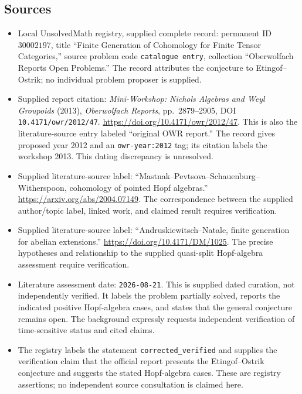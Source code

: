 \documentclass[11pt]{article}
\begin{document}
\subsection{Sources}
\begin{itemize}
\item Local UnsolvedMath registry, supplied complete record: permanent ID \(30002197\), title ``Finite Generation of Cohomology for Finite Tensor Categories,'' source problem code \texttt{catalogue entry}, collection ``Oberwolfach Reports Open Problems.'' The record attributes the conjecture to Etingof--Ostrik; no individual problem proposer is supplied.
\item Supplied report citation: \emph{Mini-Workshop: Nichols Algebras and Weyl Groupoids} (2013), \emph{Oberwolfach Reports}, pp.~2879--2905, DOI \texttt{10.4171/owr/2012/47}. \url{https://doi.org/10.4171/owr/2012/47}. This is also the literature-source entry labeled ``original OWR report.'' The record gives proposed year 2012 and an \texttt{owr-year:2012} tag; its citation labels the workshop 2013. This dating discrepancy is unresolved.
\item Supplied literature-source label: ``Mastnak--Pevtsova--Schauenburg--Witherspoon, cohomology of pointed Hopf algebras.'' \url{https://arxiv.org/abs/2004.07149}. The correspondence between the supplied author/topic label, linked work, and claimed result requires verification.
\item Supplied literature-source label: ``Andruskiewitsch--Natale, finite generation for abelian extensions.'' \url{https://doi.org/10.4171/DM/1025}. The precise hypotheses and relationship to the supplied quasi-split Hopf-algebra assessment require verification.
\item Literature assessment date: \texttt{2026-08-21}. This is supplied dated curation, not independently verified. It labels the problem partially solved, reports the indicated positive Hopf-algebra cases, and states that the general conjecture remains open. The background expressly requests independent verification of time-sensitive status and cited claims.
\item The registry labels the statement \texttt{corrected\_verified} and supplies the verification claim that the official report presents the Etingof--Ostrik conjecture and suggests the stated Hopf-algebra cases. These are registry assertions; no independent source consultation is claimed here.
\end{itemize}
\end{document}
